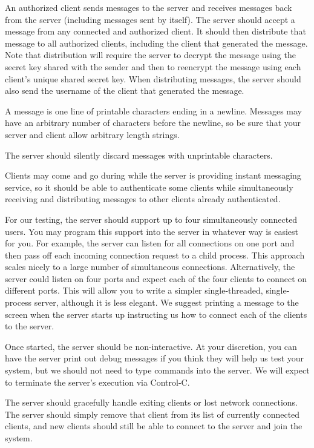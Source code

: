 \documentclass[letterpaper]{article}
\begin{document}
An authorized client sends messages to the server and receives messages back from
the server (including messages sent by itself). The server should accept a message
from any connected and authorized client. It should then distribute that message to
all authorized clients, including the client that generated the message. Note that
distribution will require the server to decrypt the message using the secret key
shared with the sender and then to reencrypt the message using each client’s unique
shared secret key. When distributing messages, the server should also send the
username of the client that generated the message.

A message is one line of printable characters ending in a newline. Messages may
have an arbitrary number of characters before the newline, so be sure that your
server and client allow arbitrary length strings.

The server should silently discard messages with unprintable characters.

Clients may come and go during while the server is providing instant messaging
service, so it should be able to authenticate some clients while simultaneously
receiving and distributing messages to other clients already authenticated.

For our testing, the server should support up to four simultaneously connected
users. You may program this support into the server in whatever way is easiest for
you. For example, the server can listen for all connections on one port and then pass
off each incoming connection request to a child process. This approach scales nicely
to a large number of simultaneous connections. Alternatively, the server could listen
on four ports and expect each of the four clients to connect on different ports. This
will allow you to write a simpler single-threaded, single-process server, although it
is less elegant. We suggest printing a message to the screen when the server starts
up instructing us how to connect each of the clients to the server.

Once started, the server should be non-interactive. At your discretion, you can have
the server print out debug messages if you think they will help us test your system,
but we should not need to type commands into the server. We will expect to
terminate the server's execution via Control-C.

The server should gracefully handle exiting clients or lost network connections. The
server should simply remove that client from its list of currently connected clients,
and new clients should still be able to connect to the server and join the system.
\end{document}
